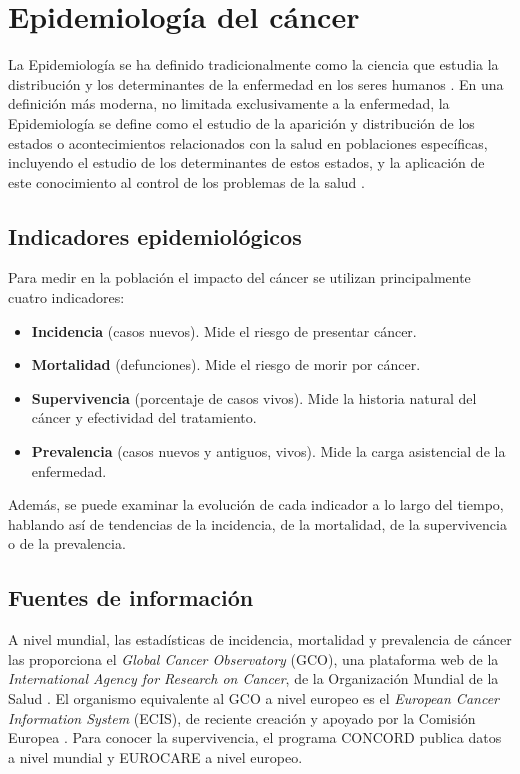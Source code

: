 \chapter{Epidemiología del cáncer}

La Epidemiología se ha definido tradicionalmente como la ciencia que estudia la distribución y los determinantes de la enfermedad en los seres humanos \cite{MacMahon1970}. En una definición más moderna, no limitada exclusivamente a la enfermedad, la Epidemiología se define como el estudio de la aparición y distribución de los estados o acontecimientos relacionados con la salud en poblaciones específicas, incluyendo el estudio de los determinantes de estos estados, y la aplicación de este conocimiento al control de los problemas de la salud \cite{Porta2008}.

\section{Indicadores epidemiológicos}

Para medir en la población el impacto del cáncer se utilizan principalmente cuatro indicadores:

\begin{itemize}
	\item \textbf{Incidencia} (casos nuevos). Mide el riesgo de presentar cáncer.
	\item \textbf{Mortalidad} (defunciones). Mide el riesgo de morir por cáncer.
	\item \textbf{Supervivencia} (porcentaje de casos vivos). Mide la historia natural del cáncer y efectividad del tratamiento.
	\item \textbf{Prevalencia} (casos nuevos y antiguos, vivos). Mide la carga asistencial de la enfermedad.
\end{itemize}

Además, se puede examinar la evolución de cada indicador a lo largo del tiempo, hablando así de tendencias de la incidencia, de la mortalidad, de la supervivencia o de la prevalencia.\\


\section{Fuentes de información}

A nivel mundial, las estadísticas de incidencia, mortalidad y prevalencia de cáncer las proporciona el \textit{Global Cancer Observatory} (GCO), una plataforma web de la \textit{International Agency for Research on Cancer}, de la Organización Mundial de la Salud \cite{Bray2018, GCO}. El organismo equivalente al GCO a nivel europeo es el \textit{European Cancer Information System} (ECIS), de reciente creación y apoyado por la Comisión Europea \cite{ECIS, ECIS2}. Para conocer la supervivencia, el programa CONCORD \cite{Allemani2018} publica datos a nivel mundial y EUROCARE \cite{DeAngelis2014} a nivel europeo.\\

